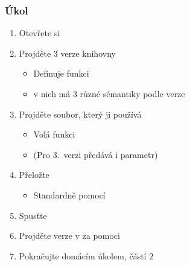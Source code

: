 \begin{frame}
  \frametitle{Úkol}

  \begin{enumerate}
    \item Otevřete si 
    \item Projděte 3 verze knihovny 
    \begin{itemize}
      \item Definuje funkci 
      \item {} v nich má 3 různé sémantiky podle verze
    \end{itemize}
    \item Projděte soubor, který ji používá 
    \begin{itemize}
      \item Volá funkci 
      \item (Pro 3.\ verzi předává i parametr)
    \end{itemize}
    \item Přeložte
    \begin{itemize}
      \item Standardně pomocí 
    \end{itemize}
    \item Spusťte 
    \item Projděte verze v  za pomoci 

    \iffimuni
      \item Pokračujte domácím úkolem, částí 2
    \fi
  \end{enumerate}

\end{frame}
